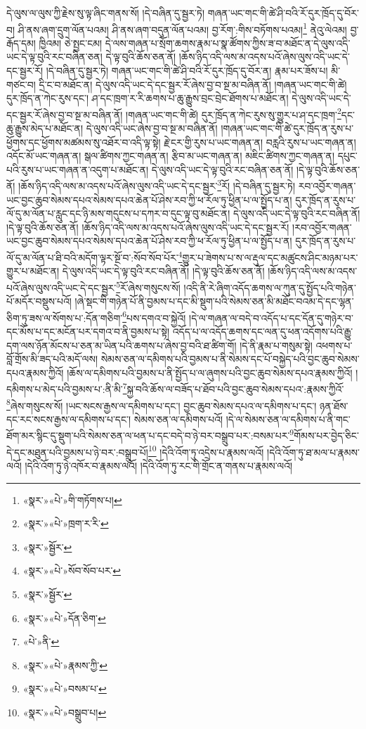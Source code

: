 དེ་ལུས་ལ་ལུས་ཀྱི་རྗེས་སུ་ལྟ་ཞིང་གནས་སོ། །དེ་བཞིན་དུ་སྦྱར་ཏེ། གཞན་ཡང་གང་གི་ཚེ་ཤི་བའི་རོ་དུར་ཁྲོད་དུ་བོར་བ། ཤི་ནས་ཞག་དྲུག་ལོན་པའམ། ཤི་ནས་ཞག་བདུན་ལོན་པའམ། བྱ་རོག་:གིས་བཏོགས་པའམ།\footnote{«སྣར་»«པེ་»གི་གཏོགས་པ།} ནེའུ་ལེའམ། བྱ་རྒོད་དམ། ཁྱིའམ། ཅེ་སྤྱང་ངམ། དེ་ལས་གཞན་པ་སྲོག་ཆགས་རྣམ་པ་སྣ་ཚོགས་ཀྱིས་ཟ་བ་མཐོང་ན་དེ་ལུས་འདི་ཡང་དེ་ལྟ་བུའི་རང་བཞིན་ཅན། དེ་ལྟ་བུའི་ཆོས་ཅན་ནོ། །ཆོས་ཉིད་འདི་ལས་མ་འདས་པའོ་ཞེས་ལུས་འདི་ཡང་དེ་དང་སྦྱར་རོ། །དེ་བཞིན་དུ་སྦྱར་ཏེ། གཞན་ཡང་གང་གི་ཚེ་ཤི་བའི་རོ་དུར་ཁྲོད་དུ་བོར་ན། རྣམ་པར་ཟོས་པ། མི་གཙང་བ། དྲི་ང་བ་མཐོང་ན། དེ་ལུས་འདི་ཡང་དེ་དང་སྦྱར་རོ་ཞེས་བྱ་བ་སྔ་མ་བཞིན་ནོ། །གཞན་ཡང་གང་གི་ཚེ། དུར་ཁྲོད་ན་ཀེང་རུས་དང་། ཤ་དང་ཁྲག་ར་རི་ཆགས་པ་ཆུ་རྒྱུས་བྲང་བྲེང་ཐོགས་པ་མཐོང་ན། དེ་ལུས་འདི་ཡང་དེ་དང་སྦྱར་རོ་ཞེས་བྱ་བ་སྔ་མ་བཞིན་ནོ། །གཞན་ཡང་གང་གི་ཚེ། དུར་ཁྲོད་ན་ཀེང་རུས་སུ་གྱུར་པ་ཤ་དང་ཁྲག་\footnote{«སྣར་»«པེ་»ཁྲག་ར་རི་}དང་ཆུ་རྒྱུས་མེད་པ་མཐོང་ན། དེ་ལུས་འདི་ཡང་ཞེས་བྱ་བ་སྔ་མ་བཞིན་ནོ། །གཞན་ཡང་གང་གི་ཚེ་དུར་ཁྲོད་ན་རུས་པ་ཕྱོགས་དང་ཕྱོགས་མཚམས་སུ་འཐོར་བ་འདི་ལྟ་སྟེ། རྗེ་ངར་གྱི་རུས་པ་ཡང་གཞན་ན། བརླའི་རུས་པ་ཡང་གཞན་ན། འདོང་མོ་ཡང་གཞན་ན། སྒལ་ཚིགས་ཀྱང་གཞན་ན། རྩིབ་མ་ཡང་གཞན་ན། མཇིང་ཚིགས་ཀྱང་གཞན་ན། དཔུང་པའི་རུས་པ་ཡང་གཞན་ན་འདུག་པ་མཐོང་ན། དེ་ལུས་འདི་ཡང་དེ་ལྟ་བུའི་རང་བཞིན་ཅན་ནོ། །དེ་ལྟ་བུའི་ཆོས་ཅན་ནོ། །ཆོས་ཉིད་འདི་ལས་མ་འདས་པའོ་ཞེས་ལུས་འདི་ཡང་དེ་དང་སྦྱར་\footnote{«སྣར་»སྦྱོར་}རོ། །དེ་བཞིན་དུ་སྦྱར་ཏེ། རབ་འབྱོར་གཞན་ཡང་བྱང་ཆུབ་སེམས་དཔའ་སེམས་དཔའ་ཆེན་པོ་ཤེས་རབ་ཀྱི་ཕ་རོལ་ཏུ་ཕྱིན་པ་ལ་སྤྱོད་པ་ན། དུར་ཁྲོད་ན་རུས་པ་ལོ་དུ་མ་ལོན་པ་རླུང་དང་ཉི་མས་གདུངས་པ་དཀར་བ་དུང་ལྟ་བུ་མཐོང་ན། དེ་ལུས་འདི་ཡང་དེ་ལྟ་བུའི་རང་བཞིན་ནོ། །དེ་ལྟ་བུའི་ཆོས་ཅན་ནོ། །ཆོས་ཉིད་འདི་ལས་མ་འདས་པའོ་ཞེས་ལུས་འདི་ཡང་དེ་དང་སྦྱར་རོ། །རབ་འབྱོར་གཞན་ཡང་བྱང་ཆུབ་སེམས་དཔའ་སེམས་དཔའ་ཆེན་པོ་ཤེས་རབ་ཀྱི་ཕ་རོལ་ཏུ་ཕྱིན་པ་ལ་སྤྱོད་པ་ན། དུར་ཁྲོད་ན་རུས་པ་ལོ་དུ་མ་ལོན་པ་ཐི་བའི་མདོག་ལྟར་སྔོ་བ་:སོབ་སོབ་པོར་\footnote{«སྣར་»«པེ་»སོབ་སོབ་པར་}གྱུར་པ་ཟེགས་པ་ས་ལ་རྡུལ་དང་མཚུངས་ཤིང་མཉམ་པར་གྱུར་པ་མཐོང་ན། དེ་ལུས་འདི་ཡང་དེ་ལྟ་བུའི་རང་བཞིན་ནོ། །དེ་ལྟ་བུའི་ཆོས་ཅན་ནོ། །ཆོས་ཉིད་འདི་ལས་མ་འདས་པའོ་ཞེས་ལུས་འདི་ཡང་དེ་དང་སྦྱར་\footnote{«སྣར་»སྦྱོར་}རོ་ཞེས་གསུངས་སོ། །འདི་ནི་རེ་ཞིག་འདོད་ཆགས་ལ་ཀུན་དུ་སྤྱོད་པའི་གཉེན་པོ་མདོར་བསྡུས་པའོ། །ཞེ་སྡང་གི་གཉེན་པོ་ནི་བྱམས་པ་དང་མི་སྡུག་པའི་སེམས་ཅན་མི་མཐོང་བའམ་དེ་དང་ལྷན་ཅིག་ཏུ་ཟས་ལ་སོགས་པ་:དོན་གཅིག་\footnote{«སྣར་»«པེ་»དོན་ཅིག་}པས་དགའ་བ་སྐྱེའོ། །དེ་ལ་གཞན་ལ་བདེ་བ་འདོད་པ་དང་དོན་དུ་གཉེར་བ་དང་མོས་པ་དང་མངོན་པར་དགའ་བ་ནི་བྱམས་པ་སྟེ། འདོད་པ་ལ་འདོད་ཆགས་དང་ལན་དུ་ཕན་འདོགས་པའི་རྒྱུ་དག་ལས་ཉོན་མོངས་པ་ཅན་མ་ཡིན་པའི་ཆགས་པ་ཞེས་བྱ་བའི་ཐ་ཚིག་གོ། །དེ་ནི་རྣམ་པ་གསུམ་སྟེ། འཕགས་པ་བློ་གྲོས་མི་ཟད་པའི་མདོ་ལས། སེམས་ཅན་ལ་དམིགས་པའི་བྱམས་པ་ནི་སེམས་དང་པོ་བསྐྱེད་པའི་བྱང་ཆུབ་སེམས་དཔའ་རྣམས་ཀྱིའོ། །ཆོས་ལ་དམིགས་པའི་བྱམས་པ་ནི་སྤྱོད་པ་ལ་ཞུགས་པའི་བྱང་ཆུབ་སེམས་དཔའ་རྣམས་ཀྱིའོ། །དམིགས་པ་མེད་པའི་བྱམས་པ་:ནི་མི་\footnote{«པེ་»ནི་}སྐྱ་བའི་ཆོས་ལ་བཟོད་པ་ཐོབ་པའི་བྱང་ཆུབ་སེམས་དཔའ་:རྣམས་ཀྱིའོ་\footnote{«སྣར་»«པེ་»རྣམས་ཀྱི་}ཞེས་གསུངས་སོ། །ཡང་སངས་རྒྱས་ལ་དམིགས་པ་དང་། བྱང་ཆུབ་སེམས་དཔའ་ལ་དམིགས་པ་དང་། ཉན་ཐོས་དང་རང་སངས་རྒྱས་ལ་དམིགས་པ་དང་། སེམས་ཅན་ལ་དམིགས་པའོ། །དེ་ལ་སེམས་ཅན་ལ་དམིགས་པ་ནི་གང་ཐོག་མར་སྙིང་དུ་སྡུག་པའི་སེམས་ཅན་ལ་ཕན་པ་དང་བདེ་བ་ཉེ་བར་བསྒྲུབ་པར་:བསམ་པར་\footnote{«སྣར་»«པེ་»བསམ་པ་}གོམས་པར་བྱེད་ཅིང་དེ་དང་མཐུན་པའི་བྱམས་པ་ཉེ་བར་:བསྒྲུབ་པོ།\footnote{«སྣར་»«པེ་»བསྒྲུབ་པ།} །དེའི་འོག་ཏུ་འདྲེས་པ་རྣམས་ལའོ། །དེའི་འོག་ཏུ་ཐ་མལ་པ་རྣམས་ལའོ། །དེའི་འོག་ཏུ་ཉེ་འཁོར་བ་རྣམས་ལའོ། །དེའི་འོག་ཏུ་རང་གི་གྲོང་ན་གནས་པ་རྣམས་ལའོ། 